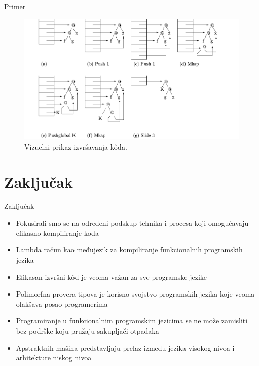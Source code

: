 \documentclass[xcolor={dvipsnames}, 11pt]{beamer}
\begin{document}
\begin{frame}{Primer}
	\begin{figure}[H]
		\centering
		\includegraphics[width=\linewidth]{primerGmasine.png}
		\caption{Vizuelni prikaz izvršavanja k\^ oda.}
		\label{fig:primerGmasine}
	\end{figure}

\end{frame}

\section{Zaključak}
\begin{frame}{Zaključak}
	\begin{itemize}
		\item Fokusirali smo se na određeni podskup tehnika i procesa koji omogućavaju efikasno
		kompiliranje koda
		\item Lambda račun kao međujezik za kompiliranje funkcionalnih programskih jezika
		\item Efikasan izvršni k\^ od je veoma važan za sve programske jezike
		\item Polimorfna provera tipova je korisno svojstvo programskih jezika koje veoma olakšava posao programerima
		\item Programiranje u funkcionalnim programskim jezicima se ne može zamisliti bez podrške koju pružaju sakupljači otpadaka 
		\item Apstraktnih mašina predstavljaju prelaz između jezika visokog nivoa i arhitekture niskog nivoa
	\end{itemize}
\end{frame}
\end{document}
